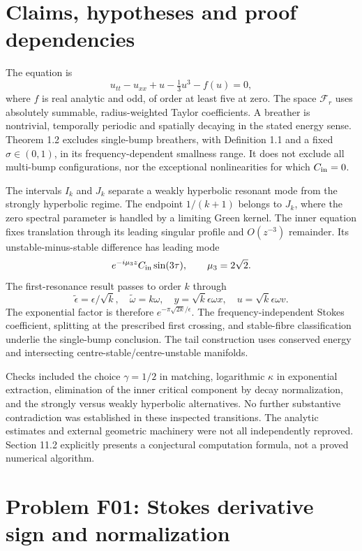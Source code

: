 \documentclass[10pt]{article}
\begin{document}
\section*{Claims, hypotheses and proof dependencies}
The equation is \[u_{tt}-u_{xx}+u-\tfrac13u^3-f(u)=0,\] where \(f\) is real analytic and odd, of order at least five at zero. The space \(\mathcal F_r\) uses absolutely summable, radius-weighted Taylor coefficients. A breather is nontrivial, temporally periodic and spatially decaying in the stated energy sense. Theorem 1.2 excludes single-bump breathers, with Definition 1.1 and a fixed \(\sigma\in(0,1)\), in its frequency-dependent smallness range. It does not exclude all multi-bump configurations, nor the exceptional nonlinearities for which \(C_{\rm in}=0\).\par
The intervals \(I_k\) and \(J_k\) separate a weakly hyperbolic resonant mode from the strongly hyperbolic regime. The endpoint \(1/(k+1)\) belongs to \(J_k\), where the zero spectral parameter is handled by a limiting Green kernel. The inner equation fixes translation through its leading singular profile and \(O(z^{-3})\) remainder. Its unstable-minus-stable difference has leading mode \[e^{-i\mu_3z}C_{\rm in}\sin(3\tau),\qquad \mu_3=2\sqrt2.\] The first-resonance result passes to order \(k\) through \[\widetilde\epsilon=\epsilon/\sqrt{k},\quad
\widetilde\omega=k\omega,\quad y=\sqrt{k}\epsilon\omega x,\quad
u=\sqrt{k}\epsilon\omega v.\] The exponential factor is therefore \(e^{-\pi\sqrt{2k}/\epsilon}\). The frequency-independent Stokes coefficient, splitting at the prescribed first crossing, and stable-fibre classification underlie the single-bump conclusion. The tail construction uses conserved energy and intersecting centre-stable/centre-unstable manifolds.\par
Checks included the choice \(\gamma=1/2\) in matching, logarithmic \(\kappa\) in exponential extraction, elimination of the inner critical component by decay normalization, and the strongly versus weakly hyperbolic alternatives. No further substantive contradiction was established in these inspected transitions. The analytic estimates and external geometric machinery were not all independently reproved. Section 11.2 explicitly presents a conjectural computation formula, not a proved numerical algorithm.\par
\section*{Problem F01: Stokes derivative sign and normalization}
\end{document}
